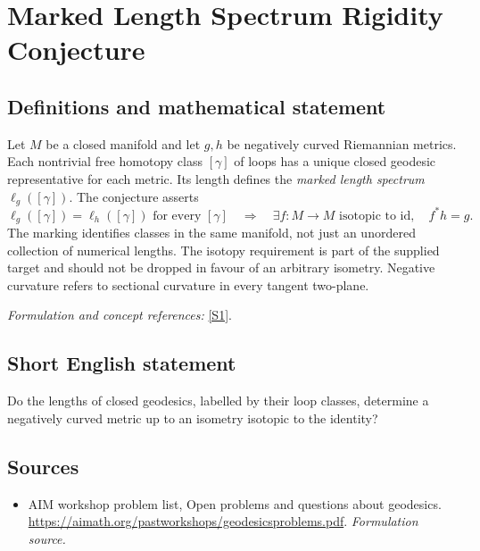 \documentclass[11pt]{article}
\begin{document}
\section*{\texorpdfstring{Marked Length Spectrum Rigidity Conjecture}{Marked Length Spectrum Rigidity Conjecture}}\label{309}
\subsection{Definitions and mathematical statement}
Let $M$ be a closed manifold and let $g,h$ be negatively curved Riemannian metrics. Each nontrivial free homotopy class $[\gamma]$ of loops has a unique closed geodesic representative for each metric. Its length defines the \emph{marked length spectrum} $\ell_g([\gamma])$. The conjecture asserts
\[
 \ell_g([\gamma])=\ell_h([\gamma])\text{ for every }[\gamma]
 \quad\Longrightarrow\quad
 \exists f:M\to M\text{ isotopic to }\mathrm{id},\quad f^*h=g.
\]
The marking identifies classes in the same manifold, not just an unordered collection of numerical lengths. The isotopy requirement is part of the supplied target and should not be dropped in favour of an arbitrary isometry. Negative curvature refers to sectional curvature in every tangent two-plane.
\par\smallskip\textit{Formulation and concept references:} \href{https://aimath.org/pastworkshops/geodesicsproblems.pdf}{[S1]}.

\subsection{Short English statement}
Do the lengths of closed geodesics, labelled by their loop classes, determine a negatively curved metric up to an isometry isotopic to the identity?
\subsection{Sources}
\begin{itemize}
\item[S1]AIM workshop problem list, Open problems and questions about geodesics.
\url{https://aimath.org/pastworkshops/geodesicsproblems.pdf}.
\textit{Formulation source.}
\end{itemize}
\end{document}
